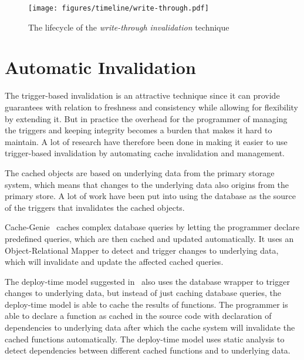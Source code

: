 \begin{figure*}[ht!]
  \centering
  \texttt{[image: figures/timeline/write-through.pdf]}
  \caption{The lifecycle of the \emph{write-through invalidation} technique}
  \label{fig:timeline:write-through}
\end{figure*}


\section{Automatic Invalidation}
\label{subsec:automatic_invalidation}

The trigger-based invalidation is an attractive technique since it can provide guarantees with relation to freshness and consistency while allowing for flexibility by extending it. But in practice the overhead for the programmer of managing the triggers and keeping integrity becomes a burden that makes it hard to maintain. A lot of research have therefore been done in making it easier to use trigger-based invalidation by automating cache invalidation and management.

The cached objects are based on underlying data from the primary storage system, which means that changes to the underlying data also origins from the primary store. A lot of work have been put into using the database as the source of the triggers that invalidates the cached objects.

Cache-Genie~\cite{paper:cache-genie} caches complex database queries by letting the programmer declare predefined queries, which are then cached and updated automatically. It uses an Object-Relational Mapper to detect and trigger changes to underlying data, which will invalidate and update the affected cached queries.

The deploy-time model suggested in~\cite{paper:deploy-time} also uses the database wrapper to trigger changes to underlying data, but instead of just caching database queries, the deploy-time model is able to cache the results of functions. The programmer is able to declare a function as cached in the source code with declaration of dependencies to underlying data after which the cache system will invalidate the cached functions automatically. The deploy-time model uses static analysis to detect dependencies between different cached functions and to underlying data.

